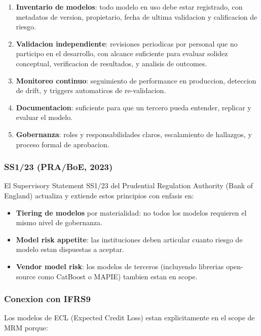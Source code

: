 \documentclass[
  spanish,
  11pt,
  letterpaper,
]{scrbook}
\providecommand{\tightlist}{%
  \setlength{\itemsep}{0pt}\setlength{\parskip}{0pt}}
\theoremstyle{plain}
\theoremstyle{remark}
\begin{document}
\begin{enumerate}
\def\labelenumi{\arabic{enumi}.}
\tightlist
\item
  \textbf{Inventario de modelos}: todo modelo en uso debe estar
  registrado, con metadatos de version, propietario, fecha de ultima
  validacion y calificacion de riesgo.
\item
  \textbf{Validacion independiente}: revisiones periodicas por personal
  que no participo en el desarrollo, con alcance suficiente para evaluar
  solidez conceptual, verificacion de resultados, y analisis de
  outcomes.
\item
  \textbf{Monitoreo continuo}: seguimiento de performance en produccion,
  deteccion de drift, y triggers automaticos de re-validacion.
\item
  \textbf{Documentacion}: suficiente para que un tercero pueda entender,
  replicar y evaluar el modelo.
\item
  \textbf{Gobernanza}: roles y responsabilidades claros, escalamiento de
  hallazgos, y proceso formal de aprobacion.
\end{enumerate}

\subsubsection{SS1/23 (PRA/BoE, 2023)}\label{ss123-praboe-2023}

El Supervisory Statement SS1/23 del Prudential Regulation Authority
(Bank of England) actualiza y extiende estos principios con enfasis en:

\begin{itemize}
\tightlist
\item
  \textbf{Tiering de modelos} por materialidad: no todos los modelos
  requieren el mismo nivel de gobernanza.
\item
  \textbf{Model risk appetite}: las instituciones deben articular cuanto
  riesgo de modelo estan dispuestas a aceptar.
\item
  \textbf{Vendor model risk}: los modelos de terceros (incluyendo
  librerias open-source como CatBoost o MAPIE) tambien estan en scope.
\end{itemize}

\subsubsection{Conexion con IFRS9}\label{conexion-con-ifrs9}

Los modelos de ECL (Expected Credit Loss) estan explicitamente en el
scope de MRM porque:
\end{document}
